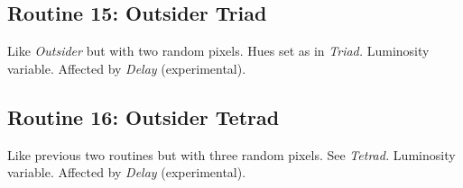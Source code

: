 \documentclass{article}
\begin{document}
	\subsection{Routine 15: Outsider Triad}
	Like \emph{Outsider} but with two random pixels. Hues set as in 
	\emph{Triad.} Luminosity variable. Affected by \emph{Delay} (experimental).

	\subsection{Routine 16: Outsider Tetrad}
	Like previous two routines but with three random pixels. See \emph{Tetrad.} 
	Luminosity variable. Affected by \emph{Delay} (experimental).
\end{document}

